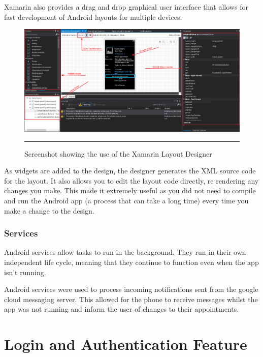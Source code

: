 Xamarin also provides a drag and drop graphical user interface that allows for fast development of Android layouts for multiple devices.

\begin{figure}
	\centering
		\includegraphics[width=\textwidth,height=\textheight,keepaspectratio]{Figures/XamarinLayoutDesigner.png}
		\rule{35em}{0.5pt}
		\caption[Screenshot showing the use of the Xamarin Layout Designer]{Screenshot showing the use of the Xamarin Layout Designer}
	\label{fig:layoutdesigner}
\end{figure}

As widgets are added to the design, the designer generates the XML source code for the layout. It also allows you to edit the layout code directly, re rendering any changes you make. This made it extremely useful as you did not need to compile and run the Android app (a process that can take a long time) every time you make a change to the design.

\subsubsection{Services}

Android services allow tasks to run in the background. They run in their own independent life cycle, meaning that they continue to function even when the app isn't running.

Android services were used to process incoming notifications sent from the google cloud messaging server. This allowed for the phone to receive messages whilst the app was not running and inform the user of changes to their appointments.

\section{Login and Authentication Feature}


